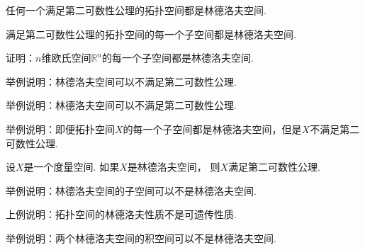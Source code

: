 \begin{theorem}[林德洛夫定理]\label{theorem:林德洛夫空间.林德洛夫定理}
任何一个满足第二可数性公理的拓扑空间都是林德洛夫空间.
\end{theorem}

\begin{corollary}
满足第二可数性公理的拓扑空间的每一个子空间都是林德洛夫空间.
\end{corollary}

\begin{example}
证明：\(n\)维欧氏空间\(\mathbb{R}^n\)的每一个子空间都是林德洛夫空间.
\end{example}

\begin{example}
举例说明：林德洛夫空间可以不满足第二可数性公理.
\end{example}

\begin{example}
举例说明：林德洛夫空间可以不满足第二可数性公理.
\end{example}

\begin{example}
举例说明：即便拓扑空间\(X\)的每一个子空间都是林德洛夫空间，但是\(X\)不满足第二可数性公理.
\end{example}

\begin{theorem}
设\(X\)是一个度量空间.
如果\(X\)是林德洛夫空间，
则\(X\)满足第二可数性公理.
\end{theorem}

\begin{example}
举例说明：林德洛夫空间的子空间可以不是林德洛夫空间.
\end{example}
\begin{remark}
上例说明：拓扑空间的林德洛夫性质不是可遗传性质.
\end{remark}

\begin{example}
举例说明：两个林德洛夫空间的积空间可以不是林德洛夫空间.
\end{example}

